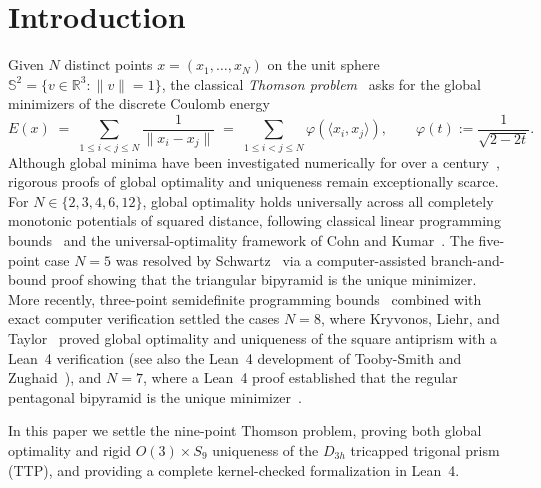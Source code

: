 \documentclass[11pt,reqno]{amsart}
\renewcommand{\_}{\origunderscore\allowbreak}
\theoremstyle{definition}
\newcommand{\R}{\mathbb{R}}
\newcommand{\Sph}{\mathbb{S}^2}
\newcommand{\ip}[2]{\langle #1, #2 \rangle}
\newcommand{\norm}[1]{\lVert #1 \rVert}
\begin{document}
\maketitle

\section{Introduction}\label{sec:intro}

Given $N$ distinct points $x = (x_1,\dots,x_N)$ on the unit sphere $\Sph = \{v \in \R^3 : \norm{v} = 1\}$, the classical \emph{Thomson problem}~\cite{Thomson1904} asks for the global minimizers of the discrete Coulomb energy
\begin{equation}\label{eq:energy}
  E(x) \;=\; \sum_{1 \le i < j \le N} \frac{1}{\norm{x_i - x_j}} \;=\; \sum_{1 \le i < j \le N} \varphi(\ip{x_i}{x_j}),
  \qquad \varphi(t) := \frac{1}{\sqrt{2 - 2t}}.
\end{equation}
Although global minima have been investigated numerically for over a century~\cite{ErberHockney1991,WalesUlker2006}, rigorous proofs of global optimality and uniqueness remain exceptionally scarce.
For $N \in \{2, 3, 4, 6, 12\}$, global optimality holds universally across all completely monotonic potentials of squared distance, following classical linear programming bounds~\cite{Yudin1992,Andreev1996,KolushovYudin1997} and the universal-optimality framework of Cohn and Kumar~\cite{CohnKumar2007}.
The five-point case $N = 5$ was resolved by Schwartz~\cite{Schwartz2013,Schwartz2023} via a computer-assisted branch-and-bound proof showing that the triangular bipyramid is the unique minimizer.
More recently, three-point semidefinite programming bounds~\cite{BachocVallentin2008,CohnWoo2012} combined with exact computer verification settled the cases $N = 8$, where Kryvonos, Liehr, and Taylor~\cite{KLT2026} proved global optimality and uniqueness of the square antiprism with a Lean~4 verification (see also the Lean~4 development of Tooby-Smith and Zughaid~\cite{TZ2026}), and $N = 7$, where a Lean~4 proof established that the regular pentagonal bipyramid is the unique minimizer~\cite{ValsN72026}.

In this paper we settle the nine-point Thomson problem, proving both global optimality and rigid $O(3) \times S_9$ uniqueness of the $D_{3h}$ tricapped trigonal prism (TTP), and providing a complete kernel-checked formalization in Lean~4.
\end{document}

